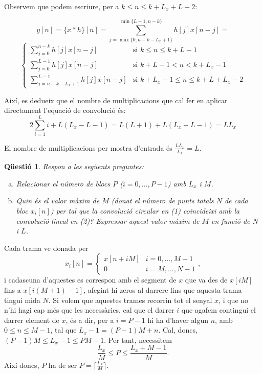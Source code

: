 \documentclass[11pt,a4]{article}
\numberwithin{equation}{section}
\theoremstyle{thmstyle}
\theoremstyle{thmstyle}
\theoremstyle{thmstyle}
\theoremstyle{thmstyle}
\theoremstyle{thmstyle}
\theoremstyle{thmstyle}
\newtheorem{question}{Qüestió}
\begin{document}
Observem que podem escriure, per a $k\leqslant n \leq k+L_x+L-2$:

$$
y[n]=\lbrace x\ast h\rbrace[n]=\sum_{j=\max{\lbrace 0, n-k-L_x+1\rbrace}}^{\min{\lbrace L-1,n-k\rbrace}} h[j]x[n-j] = 
$$
$$
\begin{cases}
\sum_{j=0}^{n-k} h[j]x[n-j]  & \text{si $k \leqslant n \leqslant k + L - 1$} \\
\sum_{j=0}^{L-1} h[j]x[n-j]  & \text{si $k+L-1 < n < k + L_x - 1$} \\
\sum_{j=n-k-L_x+1}^{L-1} h[j]x[n-j]  & \text{si $k + L_x - 1 \leqslant n \leqslant k + L + L_x - 2$}
\end{cases}
$$

Així, es dedueix que el nombre de multiplicacions que cal fer en aplicar directament l'equació de convolució és:
$$
2\sum_{i=1}^{L} i + L(L_x - L - 1) = L(L+1)+L(L_x-L-1)=LL_x
$$

El nombre de multiplicacions per mostra d'entrada és $\frac{LL_x}{L_x}=L$.

\begin{question}
Respon a les següents preguntes:
\begin{enumerate}[a)]
\item Relacionar el número de blocs $P$ ($i=0,...,P-1$) amb $L_x$ i $M$.
\item Quin és el valor màxim de $M$ (donat el número de punts totals $N$ de cada bloc $x_i[n]$) per tal que la convolució circular en (1) coincideixi amb la convolució lineal en (2)?
Expressar aquest valor màxim de $M$ en funció de $N$ i $L$.
\end{enumerate}
\end{question}

Cada trama ve donada per
$$
x_i[n] =
\begin{cases}
x[n + iM] & i = 0,\ldots,M - 1 \\
0         & i = M, \ldots, N - 1
\end{cases},
$$
i cadascuna d'aquestes es correspon amb el segment de $x$ que va des de $x[iM]$ fins a $x[i(M + 1) - 1]$, afegint-hi zeros al darrere fins que aquesta trama tingui mida $N$. Si volem que aquestes trames recorrin tot el senyal $x$, i que no n'hi hagi cap més que les necessàries, cal que el darrer $i$ que agafem contingui el darrer element de $x$, és a dir, per a $i = P - 1$ hi ha d'haver algun $n$, amb $0 \leq n \leq M - 1$, tal que $L_x - 1 = (P-1)M + n$. Cal, doncs, $(P-1)M\leqslant L_x - 1 \leqslant PM - 1$. Per tant, necessitem
$$
\frac{L_x}{M}\leqslant P \leqslant \frac{L_x + M - 1}{M}.
$$
Així doncs, $P$ ha de ser $P = \big\lceil\frac{L_x}{M}\big\rceil$.
\end{document}
